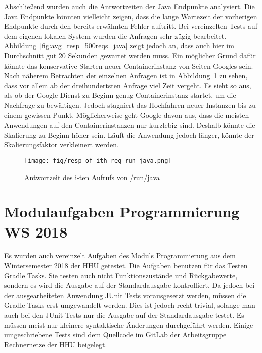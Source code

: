 Abschließend wurden auch die Antwortzeiten der Java Endpunkte analysiert.
Die Java Endpunkte könnten vielleicht zeigen, dass die lange Wartezeit der vorherigen
Endpunkte durch den bereits erwähnten Fehler auftritt.
Bei vereinzelten Tests auf dem eigenen lokalen System wurden die Anfragen
sehr zügig bearbeitet. Abbildung~\ref{fig:avg_resp_500reqs_java} zeigt jedoch
an, dass auch hier im Durchschnitt gut 20 Sekunden gewartet werden
muss. Ein möglicher Grund dafür könnte das konservative Starten
neuer Containerinstanz von Seiten Googles sein.
Nach näherem Betrachten der einzelnen Anfragen ist in
Abbildung~\ref{fig:resp_of_ith_req_run_java} zu sehen, dass vor allem
ab der dreihundertsten Anfrage viel Zeit vergeht. Es sieht so aus, als
ob der Google Dienst zu Beginn genug Containerinstanz startet, um
die Nachfrage zu bewältigen. Jedoch stagniert das Hochfahren neuer
Instanzen bis zu einem gewissen Punkt. Möglicherweise geht Google davon aus, dass
die meisten Anwendungen auf den Containerinstanzen nur kurzlebig sind.
Deshalb könnte die Skalierung zu Beginn höher sein. Läuft die
Anwendung jedoch länger, könnte der Skalierungsfaktor verkleinert werden.

\begin{figure}
  \centering
  \texttt{[image: fig/resp\_of\_ith\_req\_run\_java.png]}
  \caption{Antwortzeit des i-ten Aufrufs von /run/java}
  \label{fig:resp_of_ith_req_run_java}
\end{figure}

\section{Modulaufgaben Programmierung WS 2018}
Es wurden auch vereinzelt Aufgaben des Moduls Programmierung aus dem
Wintersemester 2018 der HHU getestet.
Die Aufgaben benutzen für das Testen Gradle Tasks.
Sie testen auch nicht Funktionszustände und Rückgabewerte, sondern es wird die
Ausgabe auf der Standardausgabe kontrolliert.
Da jedoch bei der ausgearbeiteten Anwendung JUnit Tests vorausgesetzt werden,
müssen die Gradle Tasks erst umgewandelt werden. Dies ist jedoch recht trivial,
solange man auch bei den JUnit Tests nur die Ausgabe auf der Standardausgabe
testet. Es müssen meist nur kleinere syntaktische Änderungen durchgeführt werden.
Einige umgeschriebene Tests sind dem Quellcode im GitLab der Arbeitsgruppe
Rechnernetze der HHU beigelegt.